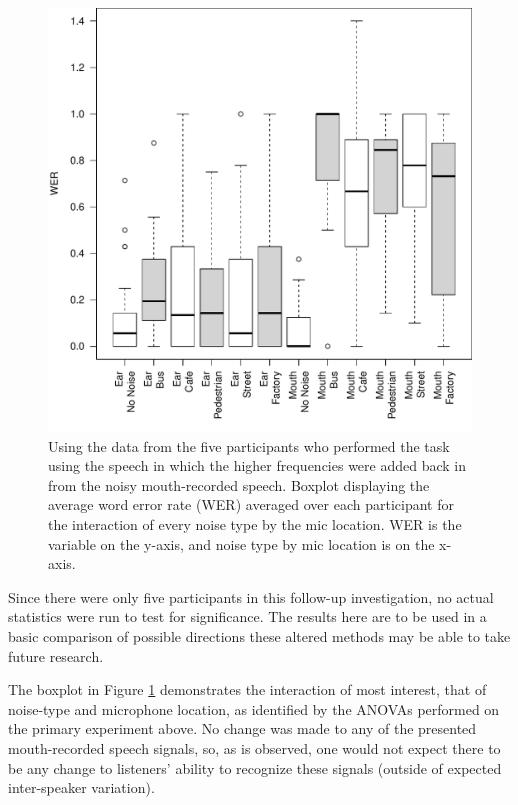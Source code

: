 \documentclass[dissertation,copyright]{uathesis}
\makeatletter
\def\maxwidth{ %
  \ifdim\Gin@nat@width>\linewidth
    \linewidth
  \else
    \Gin@nat@width
  \fi
}
\makeatother
\begin{document}
\begin{figure}[h!]%

\includegraphics[width=\maxwidth]{figure/F0_boxplot_noiseXmic-1} 

\caption{Using the data from the five participants who performed the task using the speech in which the higher frequencies were added back in from the noisy mouth-recorded speech.  Boxplot displaying the average word error rate (WER) averaged over each participant for the interaction of every noise type by the mic location. WER is the variable on the y-axis, and noise type by mic location is on the x-axis.}
\label{fig:F0_noiseXmic_boxplot}
\end{figure}

Since there were only five participants in this follow-up investigation, no actual statistics were run to test for significance.  The results here are to be used in a basic comparison of possible directions these altered methods may be able to take future research.

The boxplot in Figure \ref{fig:F0_noiseXmic_boxplot} demonstrates the interaction of most interest, that of noise-type and microphone location, as identified by the ANOVAs performed on the primary experiment above.  No change was made to any of the presented mouth-recorded speech signals, so, as is observed, one would not expect there to be any change to listeners' ability to recognize these signals (outside of expected inter-speaker variation).
\end{document}
